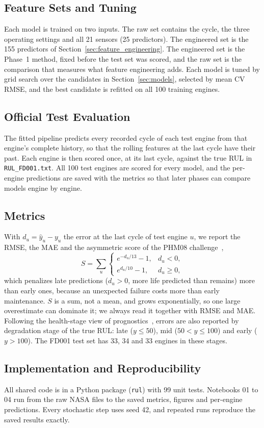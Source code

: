 \subsection{Feature Sets and Tuning}
Each model is trained on two inputs. The raw set contains the cycle, the three
operating settings and all 21 sensors (25 predictors). The engineered set is
the 155 predictors of Section~\ref{sec:feature_engineering}. The engineered
set is the Phase~1 method, fixed before the test set was scored, and the raw set
is the comparison that measures what feature engineering adds. Each model is
tuned by grid search over the candidates in Section~\ref{sec:models}, selected
by mean CV RMSE, and the best candidate is refitted on all 100 training engines.

\subsection{Official Test Evaluation}
The fitted pipeline predicts every recorded cycle of each test engine from that
engine's complete history, so that the rolling features at the last cycle have
their past. Each engine is then scored once, at its last cycle, against the
true RUL in \texttt{RUL\_FD001.txt}. All 100 test engines are scored for every
model, and the per-engine predictions are saved with the metrics so that later
phases can compare models engine by engine.

\subsection{Metrics}
With $d_u=\hat{y}_u-y_u$ the error at the last cycle of test engine $u$, we
report the RMSE, the MAE and the asymmetric score of the PHM08
challenge~\cite{Saxena2008damage},
\begin{equation}
    S=\sum_{u}
    \begin{cases}
        e^{-d_u/13}-1, & d_u<0,\\
        e^{d_u/10}-1, & d_u\ge 0,
    \end{cases}
\end{equation}
which penalizes late predictions ($d_u>0$, more life predicted than remains)
more than early ones, because an unexpected failure costs more than early
maintenance. $S$ is a sum, not a mean, and grows exponentially, so one large
overestimate can dominate it; we always read it together with RMSE and MAE.
Following the health-stage view of prognostics~\cite{Lei2018machinery}, errors
are also reported by degradation stage of the true RUL: late
($y\le 50$), mid ($50<y\le 100$) and early ($y>100$). The FD001 test set has 33,
34 and 33 engines in these stages.

\subsection{Implementation and Reproducibility}
All shared code is in a Python package (\texttt{rul}) with 99 unit tests.
Notebooks 01 to 04 run from the raw NASA files to the saved metrics, figures and
per-engine predictions. Every stochastic step uses seed 42, and repeated runs
reproduce the saved results exactly.
